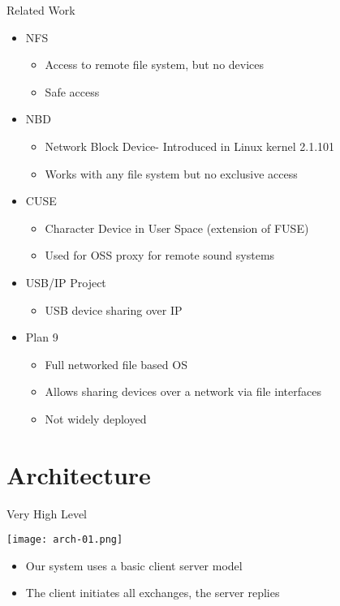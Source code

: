\documentclass[handout]{beamer}
\begin{document}
\begin{frame}{Related Work}
  \begin{itemize}
  \item NFS \cite{nfs-source}
    \begin{itemize}
    \item Access to remote file system, but no devices
    \item Safe access
    \end{itemize}
  \item NBD \cite{nbd-source}
    \begin{itemize}
    \item Network Block Device- Introduced in Linux kernel 2.1.101
    \item Works with any file system but no exclusive access 
    \end{itemize}
  \item CUSE \cite{cuse-article}
    \begin{itemize}
    \item Character Device in User Space (extension of FUSE)
    \item Used for OSS proxy for remote sound systems
    \end{itemize}
  \item USB/IP Project \cite{usbip-source}
    \begin{itemize}
    \item USB device sharing over IP
    \end{itemize}
  \item Plan 9 \cite{plan9-pike}
    \begin{itemize}
    \item Full networked file based OS
    \item Allows sharing devices over a network via file interfaces
    \item Not widely deployed
    \end{itemize}
  \end{itemize}

\end{frame}


\section{Architecture}

\begin{frame}[c]{Very High Level}
  \begin{center}
    \texttt{[image: arch-01.png]}
  \end{center}

  \begin{itemize}
    \item<1-> Our system uses a basic client server model
    \item<2-> The client initiates all exchanges, the server replies
  \end{itemize}
\end{frame}
\end{document}
